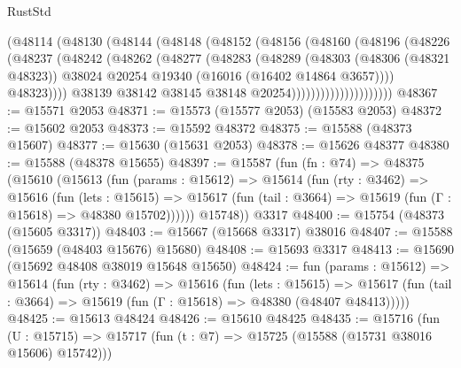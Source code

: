 \begin{lexlean}{RustStd}
\begin{coremodule}
                          (@48114
                            (@48130
                              (@48144
                                (@48148
                                  (@48152
                                    (@48156
                                      (@48160
                                        (@48196
                                          (@48226
                                            (@48237
                                              (@48242
                                                (@48262
                                                  (@48277
                                                    (@48283
                                                      (@48289
                                                        (@48303
                                                          (@48306 (@48321 @48323))
                                                          @38024
                                                          @20254
                                                          @19340
                                                          (@16016 (@16402 @14864 @3657))))
                                                      @48323))))
                                              @38139
                                              @38142
                                              @38145
                                              @38148
                                              @20254)))))))))))))))))))))
@48367 := @15571 @2053
@48371 := @15573 (@15577 @2053) (@15583 @2053)
@48372 := @15602 @2053
@48373 := @15592 @48372
@48375 := @15588 (@48373 @15607)
@48377 := @15630 (@15631 @2053)
@48378 := @15626 @48377
@48380 := @15588 (@48378 @15655)
@48397 := @15587
    (fun (fn : @74) =>
    @48375
      (@15610
        (@15613
          (fun (params : @15612) =>
          @15614
            (fun (rty : @3462) =>
            @15616
              (fun (lets : @15615) =>
              @15617 (fun (tail : @3664) => @15619 (fun (Γ : @15618) => @48380 @15702))))))
        @15748))
    @3317
@48400 := @15754 (@48373 (@15605 @3317))
@48403 := @15667 (@15668 @3317) @38016
@48407 := @15588 (@15659 (@48403 @15676) @15680)
@48408 := @15693 @3317
@48413 := @15690 (@15692 @48408 @38019 @15648 @15650)
@48424 := fun (params : @15612) =>
  @15614
    (fun (rty : @3462) =>
    @15616
      (fun (lets : @15615) =>
      @15617 (fun (tail : @3664) => @15619 (fun (Γ : @15618) => @48380 (@48407 @48413)))))
@48425 := @15613 @48424
@48426 := @15610 @48425
@48435 := @15716
    (fun (U : @15715) => @15717 (fun (t : @7) => @15725 (@15588 (@15731 @38016 @15606) @15742)))

\end{coremodule}
\end{lexlean}
